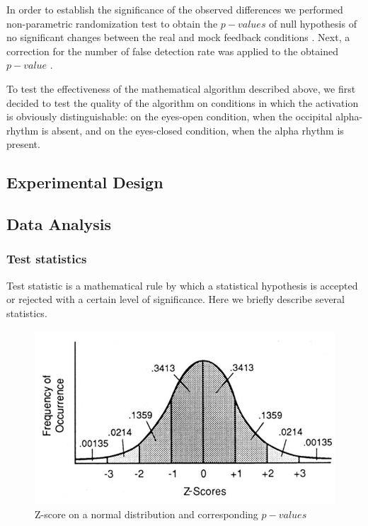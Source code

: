 \documentclass[14pt,a4paper]{scrartcl}
\begin{document}
In order to establish the significance of the observed differences we performed non-parametric randomization test to obtain the $p-values$ of null hypothesis of no significant changes between the real and mock feedback conditions \cite{Maris2007}. Next, a correction for the number of false detection rate was applied to the obtained $p-value$ \cite{Benjamini2001}.

To test the effectiveness of the mathematical algorithm described above, we first decided to test the quality of the algorithm on conditions in which the activation is obviously distinguishable: on the eyes-open condition, when the occipital alpha-rhythm is absent, and on the eyes-closed condition, when the alpha rhythm is present.

\subsection{Experimental Design}
\label{sec:Methods:Experimental Design}

\subsection{Data Analysis}
\label{sec:Methods:Data Analysis}

\subsubsection{Test statistics}
\label{sec:Methods:Data Analysis:Test statistics}

Test statistic is a mathematical rule by which a statistical hypothesis is accepted or rejected with a certain level of significance. Here we briefly describe several statistics. 

\begin{figure}[H]
\centering
\includegraphics[width=0.7\linewidth]{z-scores.jpg}
\caption{Z-score on a normal distribution and corresponding $p-values$}\label{fig:z-scores.jpg}
\end{figure}
\end{document}
